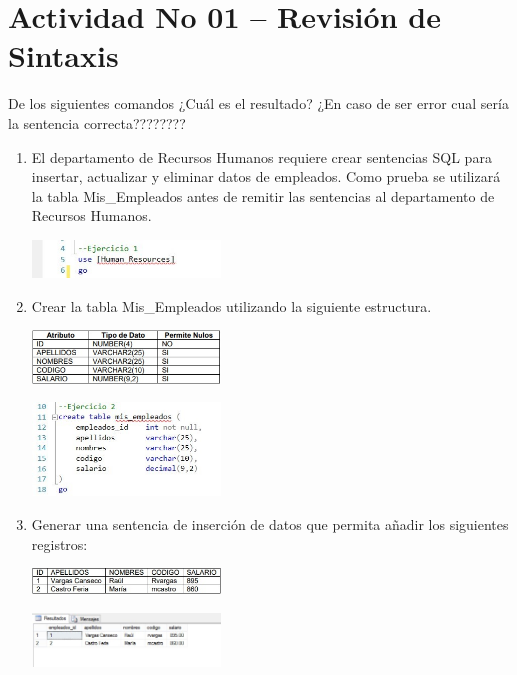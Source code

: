 \section{Actividad No 01 – Revisi\'on de Sintaxis} 
De los siguientes comandos ¿Cuál es el resultado? ¿En caso de ser error cual sería la sentencia correcta????????

\begin{enumerate}[1.]
	\item El departamento de Recursos Humanos requiere crear sentencias SQL para insertar, actualizar y eliminar datos de empleados. Como prueba se utilizará la tabla Mis\_Empleados antes de remitir las sentencias al departamento de Recursos Humanos.
	\begin{center}
	\includegraphics[width=5cm]{./Imagenes/img1} 
	\end{center}
	\item Crear la tabla Mis\_Empleados utilizando la siguiente estructura.
	\begin{center}
	\includegraphics[width=5cm]{./Imagenes/imagen0102} 
	\end{center}
	\begin{center}
	\includegraphics[width=5cm]{./Imagenes/img2} 
	\end{center}
	\item Generar una sentencia de inserción de datos que permita añadir los siguientes registros:
	\begin{center}
	\includegraphics[width=5cm]{./Imagenes/imagen0103} 
	\end{center}
	\begin{center}
	\includegraphics[width=5cm]{./Imagenes/img3} 

\end{center}
\end{enumerate}
